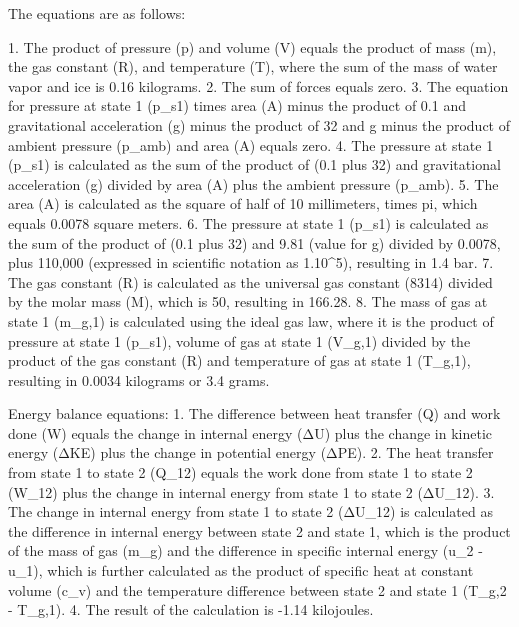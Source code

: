The equations are as follows:

1. The product of pressure (p) and volume (V) equals the product of mass (m), the gas constant (R), and temperature (T), where the sum of the mass of water vapor and ice is 0.16 kilograms.
2. The sum of forces equals zero.
3. The equation for pressure at state 1 (p_s1) times area (A) minus the product of 0.1 and gravitational acceleration (g) minus the product of 32 and g minus the product of ambient pressure (p_amb) and area (A) equals zero.
4. The pressure at state 1 (p_s1) is calculated as the sum of the product of (0.1 plus 32) and gravitational acceleration (g) divided by area (A) plus the ambient pressure (p_amb).
5. The area (A) is calculated as the square of half of 10 millimeters, times pi, which equals 0.0078 square meters.
6. The pressure at state 1 (p_s1) is calculated as the sum of the product of (0.1 plus 32) and 9.81 (value for g) divided by 0.0078, plus 110,000 (expressed in scientific notation as 1.10^5), resulting in 1.4 bar.
7. The gas constant (R) is calculated as the universal gas constant (8314) divided by the molar mass (M), which is 50, resulting in 166.28.
8. The mass of gas at state 1 (m_g,1) is calculated using the ideal gas law, where it is the product of pressure at state 1 (p_s1), volume of gas at state 1 (V_g,1) divided by the product of the gas constant (R) and temperature of gas at state 1 (T_g,1), resulting in 0.0034 kilograms or 3.4 grams.

Energy balance equations:
1. The difference between heat transfer (Q) and work done (W) equals the change in internal energy (ΔU) plus the change in kinetic energy (ΔKE) plus the change in potential energy (ΔPE).
2. The heat transfer from state 1 to state 2 (Q_12) equals the work done from state 1 to state 2 (W_12) plus the change in internal energy from state 1 to state 2 (ΔU_12).
3. The change in internal energy from state 1 to state 2 (ΔU_12) is calculated as the difference in internal energy between state 2 and state 1, which is the product of the mass of gas (m_g) and the difference in specific internal energy (u_2 - u_1), which is further calculated as the product of specific heat at constant volume (c_v) and the temperature difference between state 2 and state 1 (T_g,2 - T_g,1).
4. The result of the calculation is -1.14 kilojoules.